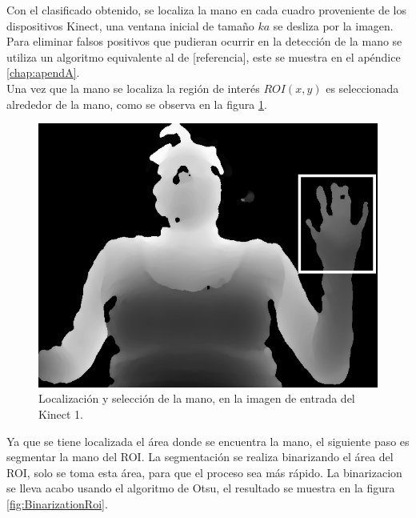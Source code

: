 Con el clasificado obtenido, se localiza la mano en cada cuadro proveniente de los dispositivos  Kinect, una ventana  inicial de tamaño $ka$ se desliza por la imagen. Para eliminar falsos positivos que pudieran ocurrir en la detección de la mano se utiliza un algoritmo equivalente al de [referencia], este se muestra en el apéndice \ref{chap:apendA}.\\ 
Una vez que la mano se localiza la región de interés $ROI(x,y)$ es seleccionada alrededor de la mano, como se observa en la figura \ref{fig:Roi}.

\begin{figure}[h!]
\begin{center}
\includegraphics[scale=.5]{./Figures/roi.png}
\end{center}
\caption{Localización y selección de la mano, en la imagen de entrada del Kinect 1.}
\label{fig:Roi}
\end{figure}  

Ya que se tiene localizada el área donde se encuentra la mano, el siguiente paso es segmentar la mano del ROI. La segmentación se realiza binarizando el área del ROI, solo se toma esta área, para que el proceso sea más rápido. La binarizacion se lleva acabo usando el algoritmo de Otsu, el resultado se muestra en la figura \ref{fig:BinarizationRoi}. 
  
